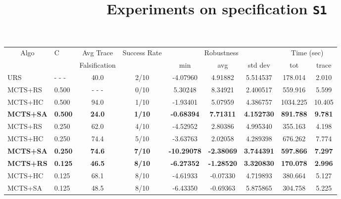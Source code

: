 \documentclass[11pt]{article}
\begin{document}
\begin{table}[ht]
\centering
\title{Experiments on specification \texttt{S1}}
\begin{tabular}{|l|l|c|c|c|c|c|c|c|}
\hline
\multicolumn{1}{|c|}{\multirow{2}{*}{Algo}} & \multirow{2}{*}{C} & Avg Trace               & \multirow{2}{*}{Success Rate} & \multicolumn{3}{c|}{Robustness} & \multicolumn{2}{c|}{Time (sec)} \\ \cline{5-9} 
\multicolumn{1}{|c|}{}                      &                    & Falsification           &                               & min       & avg      & std dev  & tot        & trace        \\ \hline
URS                                         & - - -              &  40.0                   & 2/10                          & -4.07960  & 4.91882  & 5.514537 &  178.014 &  2.010    \\ \hline
MCTS+RS                                     & 0.500              & - - -                   & 0/10                          &  5.30248  & 8.34921  & 2.400517 &  559.916 &  5.599    \\
MCTS+HC                                     & 0.500              &  94.0                   & 1/10                          & -1.93401  & 5.07959  & 4.386757 & 1034.225 & 10.405    \\
\textbf{MCTS+SA}                                     & \textbf{0.500}              &  \textbf{24.0}                   & \textbf{1/10}                          & \textbf{-0.68394}  & \textbf{7.71311}  & \textbf{4.152730} &  \textbf{891.788} &  \textbf{9.781}    \\ \hline

MCTS+RS                                     & 0.250              &  62.0                   & 4/10                          & -4.52952  &  2.80386 & 4.995340 &  355.163 &  4.198    \\
MCTS+HC                                     & 0.250              &  74.4                   & 5/10                          & -3.63763  &  2.02058 & 4.289398 &  676.262 &  7.774    \\
\textbf{MCTS+SA}                                     & \textbf{0.250}              &  \textbf{74.6}                   & \textbf{7/10}                          & \textbf{-10.29078} & \textbf{-2.38069} & \textbf{3.744391} &  \textbf{597.866} &  \textbf{7.297}    \\ \hline

\textbf{MCTS+RS}                                     & \textbf{0.125}              &  \textbf{46.5}                   & \textbf{8/10}                          & \textbf{-6.27352}  & \textbf{-1.28520} & \textbf{3.320830} &  \textbf{170.078} &  \textbf{2.996}    \\
MCTS+HC                                     & 0.125              &  68.1                   & 8/10                          & -4.61933  & -0.07330 & 4.719893 &  380.664 &  5.127    \\
MCTS+SA                                     & 0.125              &  48.5                   & 8/10                          & -6.43350  & -0.69363 & 5.875865 &  304.758 &  5.225    \\ \hline


\end{tabular}
\end{table}
\end{document}
